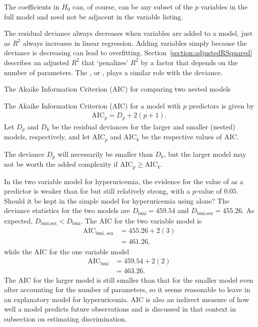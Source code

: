 The coefficients in $H_0$ can, of course, can be any subset of the $p$ variables in the full model and need not be adjacent in the variable listing.

The residual deviance always decreases when variables are added to a model, just as $R^2$ always increases in linear regression. Adding variables simply because the deviance is decreasing can lead to overfitting. Section~\ref{section:adjustedRSquared} describes an adjusted $R^2$ that `penalizes' $R^2$ by a factor that depends on the number of parameters.  The , or , plays a similar role with the deviance.

\begin{onebox}{The Akaike Information Criterion (AIC) for comparing two nested models}

The Akaike Information Criterion (AIC) for a model with $p$ predictors is given by 
\begin{align*}
  \text{AIC}_p = D_p + 2(p + 1).
\end{align*}
Let $D_p$ and $D_k$ be the residual deviances for the larger and smaller (nested) models, respectively, and let $\text{AIC}_p$ and $\text{AIC}_k$ be the respective values of AIC.

The deviance $D_p$ will necessarily be smaller than $D_k$, but the larger model may not be worth the added complexity if $\text{AIC}_p \geq \text{AIC}_k$.

\end{onebox}

In the two variable model for hyperuricemia, the evidence for the value of  as a predictor is weaker than for  but still relatively strong, with a $p$-value of $0.05$.  Should it be kept in the simple model for hyperuricemia using  alone? The deviance statistics for the two models  are $D_{\text{bmi}} = 459.54$ and $D_{\text{bmi,sex}} = 455.26$.
As expected, $D_{\text{bmi,sex}} < D_{\text{bmi}}$.  The AIC for the two variable model is 
\begin{align}
\text{AIC}_{\text{bmi, sex}} &= 455.26 + 2(3) \\
             &= 461.26,
             \label{eqn:AICBMISex}
\end{align}
while the AIC for the one variable model
\begin{align}
\text{AIC}_{\text{bmi}} &= 459.54 + 2(2)  \\
             &= 463.26.
             \label{eqn:AICBMI}
\end{align}
The AIC for the larger model is still smaller than that for the smaller model even after accounting for  the number of parameters, so it seems reasonable to leave  in an explanatory model for hyperuricemia.  AIC is also an indirect measure of how well a model predicts future observations and is discussed in that context in subsection on estimating discrimination.

